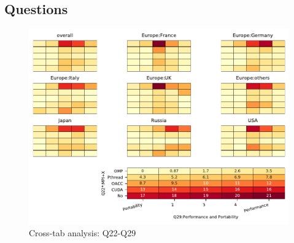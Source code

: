 
\subsection{Questions}


\begin{figure}
\begin{center}
\includegraphics[width=12cm]{../pdfs/Q22-Q29.pdf}
\caption{Cross-tab analysis: Q22-Q29}
\label{fig:Q22-Q29}
\end{center}
\end{figure}

